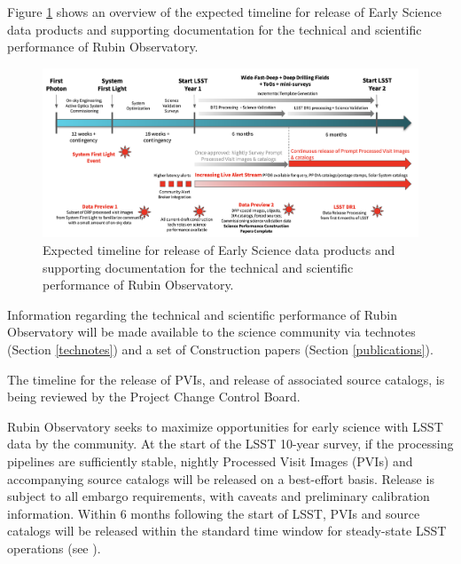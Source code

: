 \documentclass[SE,authoryear,toc,lsstdraft]{lsstdoc}
\begin{document}
Figure \ref{timeline} shows an overview of the expected timeline for release of Early Science data products and supporting documentation for the technical and scientific performance of Rubin Observatory.

\begin{figure}
  \includegraphics[width=1.0\textwidth]{timeline.png}
  \caption{Expected timeline for release of Early Science data products and supporting documentation for the technical and scientific performance of Rubin Observatory.}
  \label{timeline}
\end{figure}

Information regarding the technical and scientific performance of Rubin Observatory will be made available to the science community via technotes (Section \ref{technotes}) and a set of Construction papers (Section \ref{publications}).

\begin{warning}
  The timeline for the release of PVIs, and release of associated source catalogs, is being reviewed by the Project Change Control Board.
\end{warning}

Rubin Observatory seeks to maximize opportunities for early science with LSST data by the community.
At the start of the LSST 10-year survey, if the processing pipelines are sufficiently stable, nightly Processed Visit Images (PVIs) and accompanying source catalogs will be released on a best-effort basis.
Release is subject to all embargo requirements, with caveats and preliminary calibration information.
Within 6 months following the start of LSST, PVIs and source catalogs will be released within the standard time window for steady-state LSST operations (see ).
\end{document}
